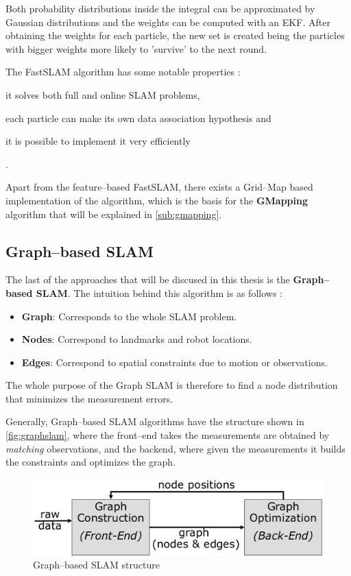 Both probability distributions inside the integral can be approximated by Gaussian distributions and the weights can be computed with an EKF. After obtaining the weights for each particle, the new set is created being the particles with bigger weights more likely to 'survive' to the next round.

The FastSLAM algorithm has some notable properties : \begin{enumerate*} \item it solves both full and online SLAM problems, \item each particle can make its own data association hypothesis and \item it is possible to implement it very efficiently \end{enumerate*}.

Apart from the feature--based FastSLAM, there exists a Grid--Map based implementation of the algorithm, which is the basis for the \textbf{GMapping} algorithm that will be explained in \autoref{sub:gmapping}.

\subsection{Graph--based SLAM}\label{sub:graphslam}

The last of the approaches that will be discused in this thesis is the \textbf{Graph--based SLAM}. The intuition behind this algorithm is as follows :
\begin{itemize}
  \item \textbf{Graph}: Corresponds to the whole SLAM problem.

  \item \textbf{Nodes}: Correspond to landmarks and robot locations.

  \item \textbf{Edges}: Correspond to spatial constraints due to motion or observations.
\end{itemize}  

The whole purpose of the Graph SLAM is therefore to find a node distribution that minimizes the measurement errors.

Generally, Graph--based SLAM algorithms have the structure shown in \autoref{fig:graphslam}, where the front--end takes the measurements are obtained by \emph{matching} observations, and the backend, where given the measurements it builds the constraints and optimizes the graph.
\begin{figure}[htb]
  \centering
  \includegraphics[width=\linewidth]{pictures/03/graphslam}
  \caption{Graph--based SLAM structure}
  \label{fig:graphslam}
\end{figure}  

